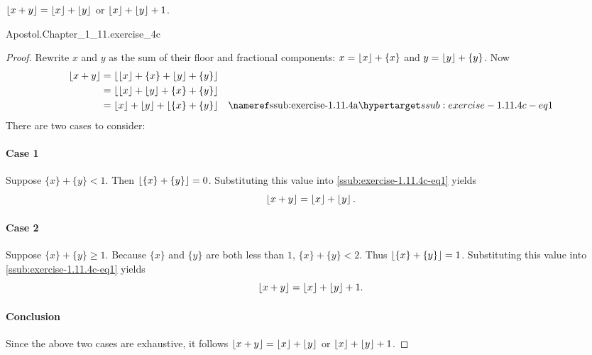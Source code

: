 \documentclass{report}
\begin{document}
\subsubsection{}%

  $\left\lfloor x + y\right\rfloor = \left\lfloor x\right\rfloor + \left\lfloor y\right\rfloor$ or $\left\lfloor x\right\rfloor + \left\lfloor y\right\rfloor + 1$.

    {Apostol.Chapter\_1\_11.exercise\_4c}

  \begin{proof}

    Rewrite $x$ and $y$ as the sum of their floor and fractional components:
      $x = \left\lfloor x\right\rfloor + \{x\}$ and $y = \left\lfloor y\right\rfloor + \{y\}$.
    Now
      \begin{align}
        \floor{x + y}
          & = \floor{\floor{x} + \{x\} + \floor{y} + \{y\}} \nonumber \\
          & = \floor{\floor{x} + \floor{y} + \{x\} + \{y\}} \nonumber \\
          & = \floor{x} + \floor{y} + \floor{\{x\} + \{y\}}
            & \textref{ssub:exercise-1.11.4a}
              \hyperlabel{ssub:exercise-1.11.4c-eq1}
      \end{align}
    There are two cases to consider:

    \paragraph{Case 1}%

      Suppose $\{x\} + \{y\} < 1$.
      Then $\left\lfloor\{x\} + \{y\}\right\rfloor = 0$.
      Substituting this value into \eqref{ssub:exercise-1.11.4c-eq1} yields
        $$\left\lfloor x + y\right\rfloor = \left\lfloor x\right\rfloor + \left\lfloor y\right\rfloor.$$

    \paragraph{Case 2}%

      Suppose $\{x\} + \{y\} \geq 1$.
      Because $\{x\}$ and $\{y\}$ are both less than $1$, $\{x\} + \{y\} < 2$.
      Thus $\left\lfloor\{x\} + \{y\}\right\rfloor = 1$.
      Substituting this value into \eqref{ssub:exercise-1.11.4c-eq1} yields
        $$\left\lfloor x + y\right\rfloor = \left\lfloor x\right\rfloor + \left\lfloor y\right\rfloor + 1.$$

    \paragraph{Conclusion}%

      Since the above two cases are exhaustive, it follows
        $\left\lfloor x + y\right\rfloor = \left\lfloor x\right\rfloor + \left\lfloor y\right\rfloor$ or $\left\lfloor x\right\rfloor + \left\lfloor y\right\rfloor + 1$.

  \end{proof}
\end{document}
